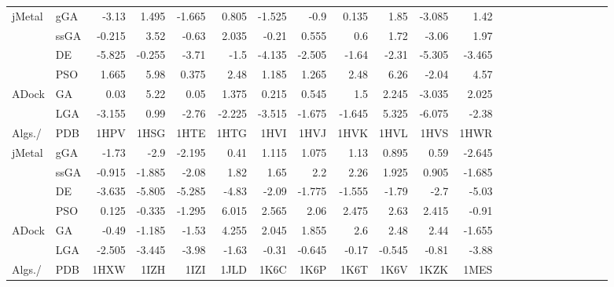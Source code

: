 \begin{table}
\begin{tabular}{ll|rrrrrrrrrrrrrrrrrrrr}
		\multirow{4}{*}{jMetal} &           gGA	 & -3.13&1.495&-1.665&0.805&-1.525&-0.9&0.135&1.85&-3.085&1.42\\
		\multirow{4}{*}{} &           ssGA & -0.215&3.52&-0.63&2.035&-0.21&0.555&0.6&1.72&-3.06&1.97\\
		\multirow{4}{*}{} &           DE	 &\cellcolor{gray25} -5.825&\cellcolor{gray25}-0.255&\cellcolor{gray25}-3.71&-1.5&\cellcolor{gray25}-4.135&\cellcolor{gray25}-2.505&-1.64&\cellcolor{gray25}-2.31&-5.305&\cellcolor{gray25}-3.465\\
		\multirow{4}{*}{} &           PSO	 & 1.665&5.98&0.375&2.48&1.185&1.265&2.48&6.26&-2.04&4.57\\
		\hline
		\multirow{2}{*}{ADock} &           GA	 & 0.03&5.22&0.05&1.375&0.215&0.545&1.5&2.245&-3.035&2.025\\
		\multirow{2}{*}{} &           LGA  & -3.155&0.99&-2.76&\cellcolor{gray25}-2.225&-3.515&-1.675&\cellcolor{gray25}-1.645&5.325&\cellcolor{gray25}-6.075&-2.38\\
		\hline
		\hline	
		Algs./ & PDB &1HPV&1HSG&1HTE&1HTG&1HVI&1HVJ&1HVK&1HVL&1HVS&1HWR\\
		\hline
		
		\multirow{4}{*}{jMetal} &           gGA	 & -1.73&-2.9&-2.195&0.41&1.115&1.075&1.13&0.895&0.59&-2.645\\
		\multirow{4}{*}{} &           ssGA & -0.915&-1.885&-2.08&1.82&1.65&2.2&2.26&1.925&0.905&-1.685\\
		\multirow{4}{*}{} &           DE	 &\cellcolor{gray25} -3.635&\cellcolor{gray25}-5.805&\cellcolor{gray25}-5.285&\cellcolor{gray25}-4.83&\cellcolor{gray25}-2.09&\cellcolor{gray25}-1.775&\cellcolor{gray25}-1.555&\cellcolor{gray25}-1.79&\cellcolor{gray25}-2.7&\cellcolor{gray25}-5.03\\
		\multirow{4}{*}{} &           PSO	 & 0.125&-0.335&-1.295&6.015&2.565&2.06&2.475&2.63&2.415&-0.91\\
		\hline
		\multirow{2}{*}{ADock} &           GA	 & -0.49&-1.185&-1.53&4.255&2.045&1.855&2.6&2.48&2.44&-1.655\\
		\multirow{2}{*}{} &           LGA  & -2.505&-3.445&-3.98&-1.63&-0.31&-0.645&-0.17&-0.545&-0.81&-3.88\\
		\hline
		\hline	
		Algs./ & PDB &1HXW&1IZH&1IZI&1JLD&1K6C&1K6P&1K6T&1K6V&1KZK&1MES\\
		\hline
		

\end{tabular}
\end{table}
